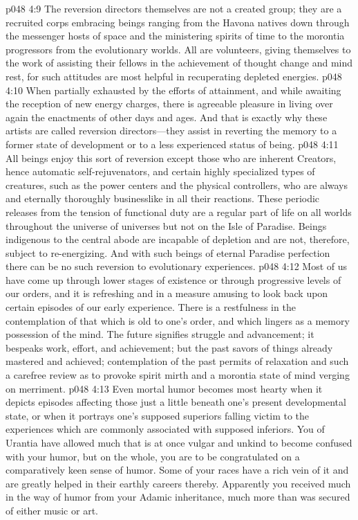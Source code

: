 \vs p048 4:9 The reversion directors themselves are not a created group; they are a recruited corps embracing beings ranging from the Havona natives down through the messenger hosts of space and the ministering spirits of time to the morontia progressors from the evolutionary worlds. All are volunteers, giving themselves to the work of assisting their fellows in the achievement of thought change and mind rest, for such attitudes are most helpful in recuperating depleted energies.
\pc \vs p048 4:10 When partially exhausted by the efforts of attainment, and while awaiting the reception of new energy charges, there is agreeable pleasure in living over again the enactments of other days and ages.  And that is exactly why these artists are called reversion directors---they assist in reverting the memory to a former state of development or to a less experienced status of being.
\vs p048 4:11 All beings enjoy this sort of reversion except those who are inherent Creators, hence automatic self\hyp{}rejuvenators, and certain highly specialized types of creatures, such as the power centers and the physical controllers, who are always and eternally thoroughly businesslike in all their reactions. These periodic releases from the tension of functional duty are a regular part of life on all worlds throughout the universe of universes but not on the Isle of Paradise. Beings indigenous to the central abode are incapable of depletion and are not, therefore, subject to re\hyp{}energizing. And with such beings of eternal Paradise perfection there can be no such reversion to evolutionary experiences.
\vs p048 4:12 Most of us have come up through lower stages of existence or through progressive levels of our orders, and it is refreshing and in a measure amusing to look back upon certain episodes of our early experience. There is a restfulness in the contemplation of that which is old to one’s order, and which lingers as a memory possession of the mind. The future signifies struggle and advancement; it bespeaks work, effort, and achievement; but the past savors of things already mastered and achieved; contemplation of the past permits of relaxation and such a carefree review as to provoke spirit mirth and a morontia state of mind verging on merriment.
\vs p048 4:13 Even mortal humor becomes most hearty when it depicts episodes affecting those just a little beneath one’s present developmental state, or when it portrays one’s supposed superiors falling victim to the experiences which are commonly associated with supposed inferiors. You of Urantia have allowed much that is at once vulgar and unkind to become confused with your humor, but on the whole, you are to be congratulated on a comparatively keen sense of humor. Some of your races have a rich vein of it and are greatly helped in their earthly careers thereby. Apparently you received much in the way of humor from your Adamic inheritance, much more than was secured of either music or art.
